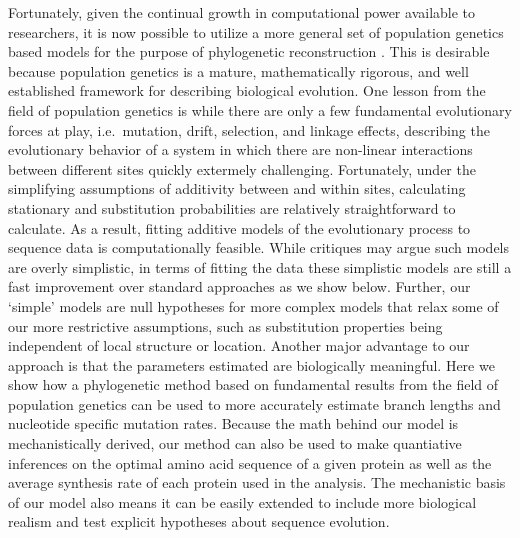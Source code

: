 \documentclass{article}
\begin{document}
Fortunately, given the continual growth in computational power available to researchers, it is now possible to utilize a more general set of population genetics based models for the purpose of phylogenetic reconstruction \citep[e.g.][]{HalpernAndBruno1998,RobinsonEtAl2003,LartillotAndPhilippe2004,RodrigueAndLartillot2014}.
This is desirable because population genetics is a mature, mathematically rigorous, and well established framework for describing biological evolution.
One lesson from the field of population genetics is while there are only a few fundamental evolutionary forces at play, i.e.~mutation, drift, selection, and linkage effects, describing the evolutionary behavior of a system in which there are non-linear interactions between different sites quickly extermely challenging.
Fortunately, under the simplifying assumptions of additivity between and within sites, calculating stationary and substitution probabilities are relatively straightforward to calculate.
As a result, fitting additive models of the evolutionary process to sequence data is computationally feasible.
While critiques may argue such models are overly simplistic, in terms of fitting the data these simplistic models are still a fast improvement over standard approaches as we show below.
Further, our `simple' models are null hypotheses for more complex models that relax some of our more restrictive assumptions, such as substitution properties being independent of local structure or location.
Another major advantage to our approach is that the parameters estimated are biologically meaningful. 
Here we show how a phylogenetic method based on fundamental results from the field of population genetics can be used to more accurately estimate branch lengths and nucleotide specific mutation rates.
Because the math behind our model is mechanistically derived, our method can also be used to make quantiative inferences on the optimal amino acid sequence of a given protein as well as the average synthesis rate of each protein used in the analysis.
The mechanistic basis of our model also means it can be easily extended to include more biological realism and test explicit hypotheses about sequence evolution.
\end{document}
